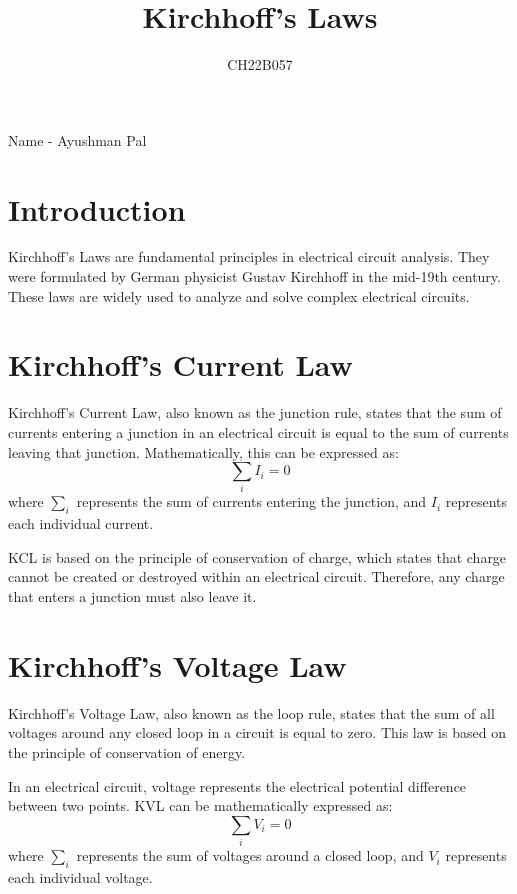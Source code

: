 \documentclass{article}
\begin{document}
\title{Kirchhoff's Laws}
\author{CH22B057}
Name - Ayushman Pal

\maketitle

\section{Introduction}
Kirchhoff's Laws are fundamental principles in electrical circuit analysis. They were formulated by German physicist Gustav Kirchhoff in the mid-19th century. These laws are widely used to analyze and solve complex electrical circuits.

\section{Kirchhoff's Current Law}
Kirchhoff's Current Law, also known as the junction rule, states that the sum of currents entering a junction in an electrical circuit is equal to the sum of currents leaving that junction. Mathematically, this can be expressed as:
\begin{equation}
\sum_{i} I_i = 0
\end{equation}
where $\sum_{i}$ represents the sum of currents entering the junction, and $I_i$ represents each individual current.

KCL is based on the principle of conservation of charge, which states that charge cannot be created or destroyed within an electrical circuit. Therefore, any charge that enters a junction must also leave it.

\section{Kirchhoff's Voltage Law}
Kirchhoff's Voltage Law, also known as the loop rule, states that the sum of all voltages around any closed loop in a circuit is equal to zero. This law is based on the principle of conservation of energy.

In an electrical circuit, voltage represents the electrical potential difference between two points. KVL can be mathematically expressed as:
\begin{equation}
\sum_{i} V_i = 0
\end{equation}
where $\sum_{i}$ represents the sum of voltages around a closed loop, and $V_i$ represents each individual voltage.
\end{document}
